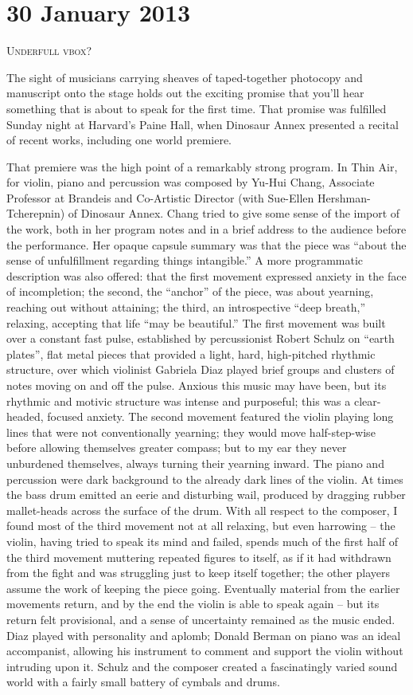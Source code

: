 \chapter{30 January 2013}

\textsc{Underfull vbox?}

The sight of musicians carrying sheaves of taped-together photocopy and manuscript onto the stage holds out the exciting promise that you’ll hear something that is about to speak for the first time. That promise was fulfilled Sunday night at Harvard's Paine Hall, when Dinosaur Annex presented a recital of recent works, including one world premiere.

That premiere was the high point of a remarkably strong program. In Thin Air, for violin, piano and percussion was composed by Yu-Hui Chang, Associate Professor at Brandeis and Co-Artistic Director (with Sue-Ellen Hershman-Tcherepnin) of Dinosaur Annex. Chang tried to give some sense of the import of the work, both in her program notes and in a brief address to the audience before the performance. Her opaque capsule summary was that the piece was “about the sense of unfulfillment regarding things intangible.” A more programmatic description was also offered: that the first movement expressed anxiety in the face of incompletion; the second, the “anchor” of the piece, was about yearning, reaching out without attaining; the third, an introspective “deep breath,” relaxing, accepting that life “may be beautiful.” The first movement was built over a constant fast pulse, established by percussionist Robert Schulz on “earth plates”, flat metal pieces that provided a light, hard, high-pitched rhythmic structure, over which violinist Gabriela Diaz played brief groups and clusters of notes moving on and off the pulse. Anxious this music may have been, but its rhythmic and motivic structure was intense and purposeful; this was a clear-headed, focused anxiety. The second movement featured the violin playing long lines that were not conventionally yearning; they would move half-step-wise before allowing themselves greater compass; but to my ear they never unburdened themselves, always turning their yearning inward. The piano and percussion were dark background to the already dark lines of the violin. At times the bass drum emitted an eerie and disturbing wail, produced by dragging rubber mallet-heads across the surface of the drum. With all respect to the composer, I found most of the third movement not at all relaxing, but even harrowing – the violin, having tried to speak its mind and failed, spends much of the first half of the third movement muttering repeated figures to itself, as if it had withdrawn from the fight and was struggling just to keep itself together; the other players assume the work of keeping the piece going. Eventually material from the earlier movements return, and by the end the violin is able to speak again – but its return felt provisional, and a sense of uncertainty remained as the music ended. Diaz played with personality and aplomb; Donald Berman on piano was an ideal accompanist, allowing his instrument to comment and support the violin without intruding upon it. Schulz and the composer created a fascinatingly varied sound world with a fairly small battery of cymbals and drums.

